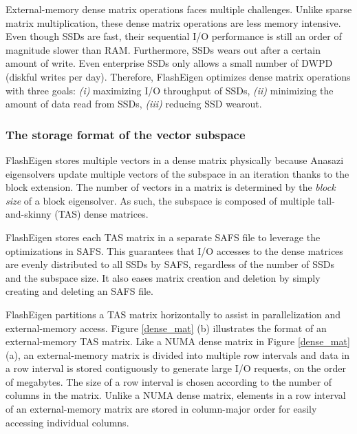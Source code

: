 External-memory dense matrix operations faces multiple challenges.
Unlike sparse matrix multiplication, these dense matrix operations are less
memory intensive. Even though SSDs are fast, their sequential I/O performance
is still an order of magnitude slower than RAM. Furthermore, SSDs wears out
after a certain amount of write. Even enterprise SSDs \cite{ocz} only allows
a small number of DWPD
(diskful writes per day). Therefore, FlashEigen optimizes dense matrix operations
with three goals: \textit{(i)} maximizing I/O throughput of SSDs, \textit{(ii)}
minimizing the amount of data read from SSDs, \textit{(iii)} reducing SSD
wearout.

%		

\subsubsection{The storage format of the vector subspace}
FlashEigen stores multiple vectors in a dense matrix physically because Anasazi
eigensolvers update multiple vectors of the subspace in an iteration thanks to
the block extension. The number of vectors in a matrix is determined by
the \textit{block size} of a block eigensolver.
As such, the subspace is composed of multiple tall-and-skinny (TAS) dense
matrices.

FlashEigen stores each TAS matrix in a separate SAFS file to leverage
the optimizations in SAFS. This guarantees that I/O accesses to the dense
matrices are evenly distributed to all SSDs by SAFS, regardless of the number
of SSDs and the subspace size. It also eases matrix creation and deletion by
simply creating and deleting an SAFS file.

FlashEigen partitions a TAS matrix horizontally to assist in parallelization
and external-memory access. Figure \ref{dense_mat} (b) illustrates the format
of an external-memory TAS matrix. Like
a NUMA dense matrix in Figure \ref{dense_mat} (a), an external-memory matrix
is divided into multiple row intervals and data in a row interval is stored
contiguously to generate large I/O requests, on the order of megabytes.
The size of a row interval is chosen according to the number of columns in the matrix.
Unlike a NUMA dense matrix, elements in a row interval of an external-memory
matrix are stored in column-major order for easily accessing individual columns.

